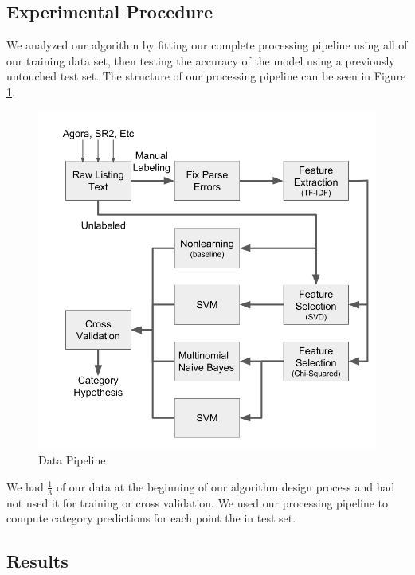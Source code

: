 

\subsection{Experimental Procedure}
We analyzed our algorithm by fitting our complete processing pipeline using all
of our training data set, then testing the accuracy of the model using a
previously untouched test set. The structure of our processing pipeline can be seen in
Figure \ref{data_pipeline}.

\begin{figure}[htbp]
    \begin{center}
        \includegraphics[width=0.85\linewidth]{pipeline}
        \caption{Data Pipeline}
    \end{center}
    \label{data_pipeline}
\end{figure}

We had $\frac{1}{3}$ of our data at the beginning of our algorithm design
process and had not used it for training or cross validation. We used our
processing pipeline to compute category predictions for each point the in test
set.

\subsection{Results}

